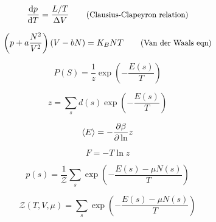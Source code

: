 \begin{equation*}
    \d{p}{T} = \frac{L/T}{\Delta V} \comment{Clausius-Clapeyron relation}
\end{equation*}

\begin{equation*}
    \left(p + a\frac{N^2}{V^{2}}\right) \left(V - bN\right) = K_{B}NT \comment{Van der Waals eqn}
\end{equation*}

\begin{equation*}
    P(S) = \frac{1}{z} \exp \left(- \frac{E(s)}{T} \right)
\end{equation*}

\begin{equation*}
    z = \sum_{s} d(s) \exp \left(- \frac{E(s)}{T} \right)
\end{equation*}

\begin{equation*}
    \langle E \rangle = -\frac{\partial \beta}{\partial \ln} z
\end{equation*}

\begin{equation*}
    F = - T \ln z
\end{equation*}

\begin{equation*}
    p(s) = \frac{1}{\mathcal{Z}} \sum_{s} \exp \left(- \frac{E(s) - \mu N(s)}{T} \right)\end{equation*}

\begin{equation*}
    \mathcal{Z}(T,V,\mu) = \sum_{s} \exp \left(- \frac{E(s) - \mu N(s)}{T} \right)
\end{equation*}
